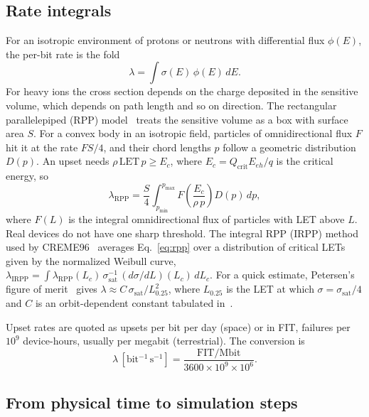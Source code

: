 \documentclass[11pt,a4paper]{article}
\newcommand{\LET}{\mathrm{LET}}
\begin{document}
\subsection{Rate integrals}

For an isotropic environment of protons or neutrons with differential flux $\phi(E)$, the per-bit rate is the fold
\begin{equation}
\lambda = \int \sigma(E)\, \phi(E)\, dE.
\label{eq:rate_e}
\end{equation}
For heavy ions the cross section depends on the charge deposited in the sensitive volume, which depends on path length and so on direction. The rectangular parallelepiped (RPP) model~\cite{pickel1978,petersen2011} treats the sensitive volume as a box with surface area $S$. For a convex body in an isotropic field, particles of omnidirectional flux $F$ hit it at the rate $FS/4$, and their chord lengths $p$ follow a geometric distribution $D(p)$. An upset needs $\rho\, \LET\, p \ge E_c$, where $E_c = Q_{\mathrm{crit}} E_{eh}/q$ is the critical energy, so
\begin{equation}
\lambda_{\mathrm{RPP}} = \frac{S}{4} \int_{p_{\min}}^{p_{\max}} F\!\left( \frac{E_c}{\rho\, p} \right) D(p)\, dp,
\label{eq:rpp}
\end{equation}
where $F(L)$ is the integral omnidirectional flux of particles with LET above $L$. Real devices do not have one sharp threshold. The integral RPP (IRPP) method used by CREME96~\cite{tylka1997} averages Eq.~\eqref{eq:rpp} over a distribution of critical LETs given by the normalized Weibull curve, $\lambda_{\mathrm{IRPP}} = \int \lambda_{\mathrm{RPP}}(L_c)\, \sigma_{\mathrm{sat}}^{-1}\, (d\sigma/dL)(L_c)\, dL_c$. For a quick estimate, Petersen's figure of merit~\cite{petersen1983fom} gives $\lambda \approx C\, \sigma_{\mathrm{sat}} / L_{0.25}^{2}$, where $L_{0.25}$ is the LET at which $\sigma = \sigma_{\mathrm{sat}}/4$ and $C$ is an orbit-dependent constant tabulated in~\cite{petersen2011}.

Upset rates are quoted as upsets per bit per day (space) or in FIT, failures per $10^9$ device-hours, usually per megabit (terrestrial). The conversion is
\begin{equation}
\lambda\,[\mathrm{bit^{-1}\,s^{-1}}] = \frac{\mathrm{FIT/Mbit}}{3600 \times 10^{9} \times 10^{6}}.
\end{equation}

\subsection{From physical time to simulation steps}
\label{sec:timebase}
\end{document}
